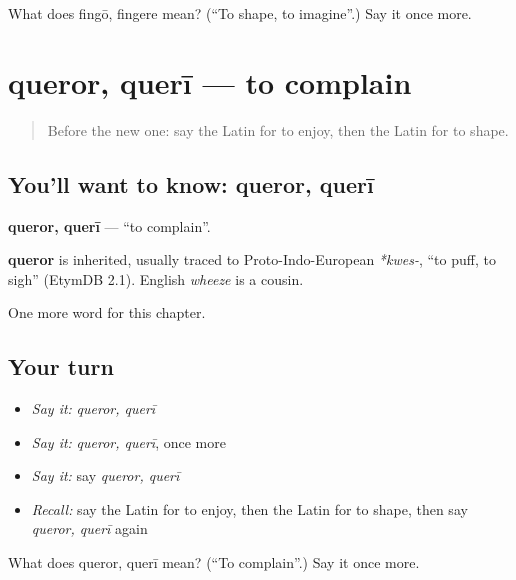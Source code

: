 \begin{tcolorbox}[breakable,colback=teal!4,colframe=teal!35!black,title={Before you move on}]
What does fingō, fingere mean? (\textquotedblleft{}To shape, to imagine\textquotedblright{}.) Say it once more.
\end{tcolorbox}
\section[queror, querī]{queror, querī — to complain}

\label{lesson:LA-C231-queror}



\begin{quote}
Before the new one: say the Latin for to enjoy, then the Latin for to shape.
\end{quote}

\subsection*{You'll want to know: queror, querī}
\textbf{queror, querī} — \textquotedblleft{}to complain\textquotedblright{}.

\begin{cousinweb}
\textbf{queror} is inherited, usually traced to Proto-Indo-European \emph{*kwes-}, \textquotedblleft{}to puff, to sigh\textquotedblright{} (EtymDB 2.1). English \emph{wheeze} is a cousin.
\end{cousinweb}

\begin{grammarlens}[title={What you've built}]
One more word for this chapter.
\end{grammarlens}

\subsection*{Your turn}
\begin{itemize}
\raggedright
  \item \emph{Say it:} \emph{queror, querī}
  \item \emph{Say it:} \emph{queror, querī}, once more
  \item \emph{Say it:} say \emph{queror, querī}
  \item \emph{Recall:} say the Latin for to enjoy, then the Latin for to shape, then say \emph{queror, querī} again
\end{itemize}

\begin{tcolorbox}[breakable,colback=teal!4,colframe=teal!35!black,title={Before you move on}]
What does queror, querī mean? (\textquotedblleft{}To complain\textquotedblright{}.) Say it once more.
\end{tcolorbox}
